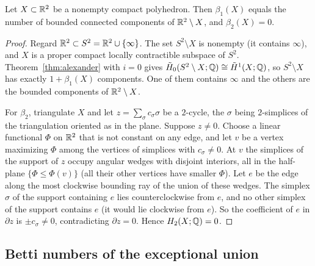 \begin{corollary}\label{cor:planar-betti}
Let $X\subset\mathbb R^2$ be a nonempty compact polyhedron. Then $\beta_1(X)$ equals the number of bounded connected components of $\mathbb R^2\setminus X$, and $\beta_2(X)=0$.
\end{corollary}
\begin{proof}
Regard $\mathbb R^2\subset S^2=\mathbb R^2\cup\{\infty\}$. The set $S^2\setminus X$ is nonempty (it contains $\infty$), and $X$ is a proper compact locally contractible subspace of $S^2$. Theorem~\ref{thm:alexander} with $i=0$ gives $\tilde H_0(S^2\setminus X;\mathbb Q)\cong\tilde H^1(X;\mathbb Q)$, so $S^2\setminus X$ has exactly $1+\beta_1(X)$ components. One of them contains $\infty$ and the others are the bounded components of $\mathbb R^2\setminus X$.

For $\beta_2$, triangulate $X$ and let $z=\sum_\sigma c_\sigma\sigma$ be a $2$-cycle, the $\sigma$ being $2$-simplices of the triangulation oriented as in the plane. Suppose $z\ne0$. Choose a linear functional $\Phi$ on $\mathbb R^2$ that is not constant on any edge, and let $v$ be a vertex maximizing $\Phi$ among the vertices of simplices with $c_\sigma\ne0$. At $v$ the simplices of the support of $z$ occupy angular wedges with disjoint interiors, all in the half-plane $\{\Phi\le\Phi(v)\}$ (all their other vertices have smaller $\Phi$). Let $e$ be the edge along the most clockwise bounding ray of the union of these wedges. The simplex $\sigma$ of the support containing $e$ lies counterclockwise from $e$, and no other simplex of the support contains $e$ (it would lie clockwise from $e$). So the coefficient of $e$ in $\partial z$ is $\pm c_\sigma\ne0$, contradicting $\partial z=0$. Hence $H_2(X;\mathbb Q)=0$.
\end{proof}

\subsection{Betti numbers of the exceptional union}

